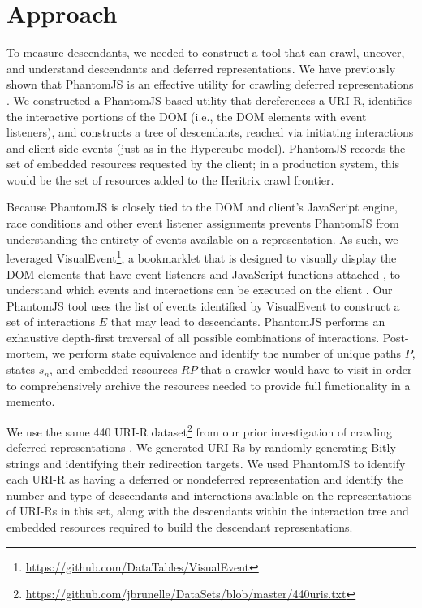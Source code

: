 \documentclass{sig-alternate}
\begin{document}
\section{Approach}
\label{approach}

To measure descendants, we needed to construct a tool that can crawl, uncover, and understand descendants and deferred representations. We have previously shown that PhantomJS is an effective utility for crawling deferred representations \cite{crawlingDeferred}. 
We constructed a PhantomJS-based utility that dereferences a URI-R, identifies the interactive portions of the DOM (i.e., the DOM elements with event listeners), and constructs a tree of descendants, reached via initiating interactions and client-side events (just as in the Hypercube model). PhantomJS records the set of embedded resources requested by the client; in a production system, this would be the set of resources added to the Heritrix crawl frontier.

Because PhantomJS is closely tied to the DOM and client's JavaScript engine, race conditions and other event listener assignments prevents PhantomJS from understanding the entirety of events available on a representation. As such, we leveraged VisualEvent\footnote{\url{https://github.com/DataTables/VisualEvent}}, a bookmarklet that is designed to visually display the DOM elements that have event listeners and JavaScript functions attached \cite{seleniumpjs}, to understand which events and interactions can be executed on the client \cite{seleniumpjs}. 
Our PhantomJS tool uses the list of events identified by VisualEvent to construct a set of interactions $E$ that may lead to descendants. PhantomJS performs an exhaustive depth-first traversal of all possible combinations of interactions. Post-mortem, we perform state equivalence and identify the number of unique paths $P$, states $s_n$, and embedded resources $RP$ that a crawler would have to visit in order to comprehensively archive the resources needed to provide full functionality in a memento.

We use the same 440 URI-R dataset\footnote{\url{https://github.com/jbrunelle/DataSets/blob/master/440uris.txt}} from our prior investigation of crawling deferred representations \cite{crawlingDeferred}. We generated URI-Rs by randomly generating Bitly strings and identifying their redirection targets. We used PhantomJS to identify each URI-R as having a deferred or nondeferred representation and identify the number and type of descendants and interactions available on the representations of URI-Rs in this set, along with the descendants within the interaction tree and embedded resources required to build the descendant representations. 
\end{document}
